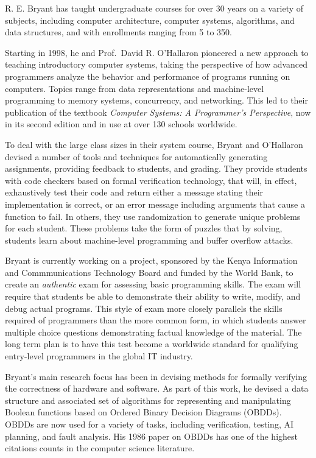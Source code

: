 \documentclass{article}
\begin{document}
R. E. Bryant has taught undergraduate courses for over 30 years on a
variety of subjects, including computer architecture,
computer systems, algorithms, and data structures, and with enrollments
ranging from 5 to 350.  

Starting in 1998, he and Prof.~David R. O'Hallaron pioneered a new
approach to teaching introductory computer systems, taking the
perspective of how advanced programmers analyze the behavior and
performance of programs running on computers.  Topics range from data
representations and machine-level programming to memory systems,
concurrency, and networking.  This led to their publication of the
textbook {\em Computer Systems: A Programmer's Perspective}, now in
its second edition and in use at over 130 schools worldwide.

To deal with the large class sizes in their system course, Bryant and
O'Hallaron devised a number of tools and techniques for automatically
generating assignments, providing feedback to students, and grading.
They provide students with code checkers based on formal verification
technology, that will, in effect, exhaustively test their code and
return either a message stating their implementation is correct, or an
error message including arguments that cause a function to fail.  In
others, they use randomization to generate unique problems for each
student.  These problems take the form of puzzles that by solving,
students learn about machine-level programming and buffer overflow
attacks.

Bryant is currently working on a project, sponsored by the Kenya
Information and Commmunications Technology Board and funded by the
World Bank, to create an {\em authentic} exam for assessing basic
programming skills.  The exam will require that students be able to
demonstrate their ability to write, modify, and debug actual programs.
This style of exam more closely parallels the skills required of
programmers than the more common form, in which students
answer multiple choice questions demonstrating factual knowledge of
the material.  The long term plan is to have this test become a
worldwide standard for qualifying entry-level programmers in the
global IT industry.

Bryant's main research focus has been in devising methods for formally
verifying the correctness of hardware and software.  As part of this
work, he devised a data structure and associated set of algorithms for
representing and manipulating Boolean functions based on Ordered
Binary Decision Diagrams (OBDDs).  OBDDs are now used for a variety of
tasks, including verification, testing, AI planning, and fault
analysis.  His 1986 paper on OBDDs has one of the highest citations
counts in the computer science literature.
\end{document}
